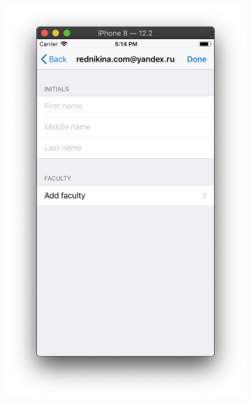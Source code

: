 \documentclass[a4paper,12pt]{article}
\begin{document}
\begin{figure}[h!]
\begin{subfigure}[b]{0.3\linewidth}
			\includegraphics[width=\linewidth]{../includes/pmi/r1.png}
		\end{subfigure}
		\begin{subfigure}[b]{0.3\linewidth}

\end{subfigure}
\end{figure}
\end{document}
